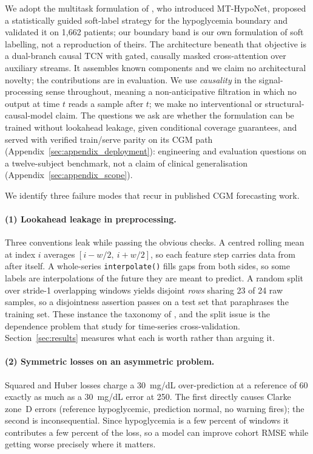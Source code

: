 \documentclass[pmlr,twocolumn,10pt]{jmlr}
\begin{document}
We adopt the multitask formulation of \citet{fang2026glucose}, who introduced
MT-HypoNet, proposed a statistically guided soft-label strategy for the
hypoglycemia boundary and validated it on 1{,}662 patients; our boundary band is
our own formulation of soft labelling, not a reproduction of theirs. The architecture beneath that objective is a dual-branch
causal TCN with gated, causally masked cross-attention over auxiliary streams.
It assembles known components and we claim no architectural novelty; the
contributions are in evaluation. We use \emph{causality} in the
signal-processing sense throughout, meaning a non-anticipative filtration in which
no output at time $t$ reads a sample after $t$; we make no interventional or
structural-causal-model claim. The questions we ask are whether the formulation
can be trained without lookahead leakage, given conditional coverage guarantees,
and served with verified train/serve parity on its CGM path
(Appendix~\ref{sec:appendix_deployment}): engineering and evaluation questions
on a twelve-subject benchmark, not a claim of clinical generalisation
(Appendix~\ref{sec:appendix_scope}).

We identify three failure modes that recur in published CGM forecasting work.

\paragraph{(1) Lookahead leakage in preprocessing.} Three conventions leak while
passing the obvious checks. A centred rolling mean at index $i$ averages
$[i - w/2,\ i + w/2]$, so each feature step carries data from after itself. A
whole-series \texttt{interpolate()} fills gaps from both sides, so some labels
are interpolations of the future they are meant to predict. A random split over
stride-1 overlapping windows yields disjoint \emph{rows} sharing 23 of 24 raw
samples, so a disjointness assertion passes on a test set that paraphrases the
training set. These instance the taxonomy of \citet{kapoor2023leakage}, and the
split issue is the dependence problem that \citet{bergmeir2012use} study for
time-series cross-validation.
Section~\ref{sec:results} measures what each is worth rather than arguing it.

\paragraph{(2) Symmetric losses on an asymmetric problem.} Squared and Huber
losses charge a 30~mg/dL over-prediction at a reference of 60 exactly as much as
a 30~mg/dL error at 250. The first directly causes Clarke zone~D errors
(reference hypoglycemic, prediction normal, no warning fires); the second is
inconsequential. Since hypoglycemia is a few percent of windows it contributes a
few percent of the loss, so a model can improve cohort RMSE while getting worse
precisely where it matters.
\end{document}
